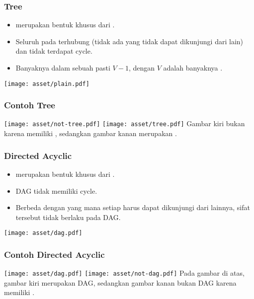 \begin{frame}
\frametitle{Tree}
\begin{itemize}
  \item \fTree merupakan bentuk khusus dari \fgraph.
  \item Seluruh \fnode pada \ftree terhubung (tidak ada \fnode yang tidak dapat dikunjungi dari \fnode lain) dan tidak terdapat \alert{cycle}.
  \item Banyaknya \fedge dalam sebuah \ftree pasti $V-1$, dengan $V$ adalah banyaknya \fnode.
\end{itemize}
\begin{center}
  \texttt{[image: asset/plain.pdf]}
\end{center}
\end{frame}

\begin{frame}
\frametitle{Contoh Tree}
\texttt{[image: asset/not-tree.pdf]}
\hspace{\fill}
\texttt{[image: asset/tree.pdf]}
\newline\newline
Gambar kiri bukan \ftree karena memiliki , sedangkan gambar kanan merupakan \ftree. 
\end{frame}

\begin{frame}
\frametitle{Directed Acyclic \fGraph}
\begin{itemize}
  \item {} merupakan bentuk khusus dari  \fgraph.
  \item DAG tidak memiliki \alert{cycle}.
  \item Berbeda dengan \ftree yang mana setiap \fnode harus dapat dikunjungi dari \fnode lainnya, sifat tersebut tidak berlaku pada DAG.
\end{itemize}
\begin{center}
  \texttt{[image: asset/dag.pdf]}
\end{center}
\end{frame}

\begin{frame}
\frametitle{Contoh Directed Acyclic \fGraph}
\texttt{[image: asset/dag.pdf]}
\hspace{\fill}
\texttt{[image: asset/not-dag.pdf]}
\newline\newline
Pada gambar di atas, gambar kiri merupakan DAG, sedangkan gambar kanan bukan DAG karena memiliki .
\end{frame}

